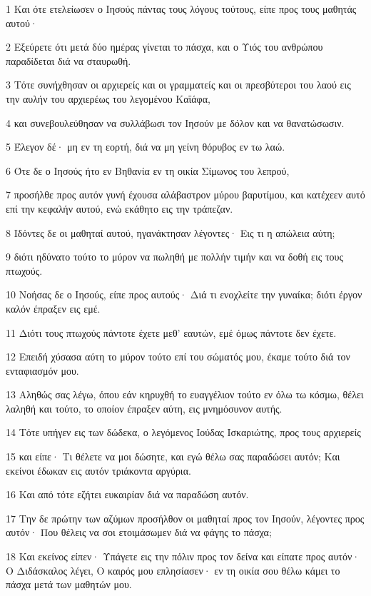 \par 1 Και ότε ετελείωσεν ο Ιησούς πάντας τους λόγους τούτους, είπε προς τους μαθητάς αυτού·
\par 2 Εξεύρετε ότι μετά δύο ημέρας γίνεται το πάσχα, και ο Υιός του ανθρώπου παραδίδεται διά να σταυρωθή.
\par 3 Τότε συνήχθησαν οι αρχιερείς και οι γραμματείς και οι πρεσβύτεροι του λαού εις την αυλήν του αρχιερέως του λεγομένου Καϊάφα,
\par 4 και συνεβουλεύθησαν να συλλάβωσι τον Ιησούν με δόλον και να θανατώσωσιν.
\par 5 Έλεγον δέ· μη εν τη εορτή, διά να μη γείνη θόρυβος εν τω λαώ.
\par 6 Ότε δε ο Ιησούς ήτο εν Βηθανία εν τη οικία Σίμωνος του λεπρού,
\par 7 προσήλθε προς αυτόν γυνή έχουσα αλάβαστρον μύρου βαρυτίμου, και κατέχεεν αυτό επί την κεφαλήν αυτού, ενώ εκάθητο εις την τράπεζαν.
\par 8 Ιδόντες δε οι μαθηταί αυτού, ηγανάκτησαν λέγοντες· Εις τι η απώλεια αύτη;
\par 9 διότι ηδύνατο τούτο το μύρον να πωληθή με πολλήν τιμήν και να δοθή εις τους πτωχούς.
\par 10 Νοήσας δε ο Ιησούς, είπε προς αυτούς· Διά τι ενοχλείτε την γυναίκα; διότι έργον καλόν έπραξεν εις εμέ.
\par 11 Διότι τους πτωχούς πάντοτε έχετε μεθ' εαυτών, εμέ όμως πάντοτε δεν έχετε.
\par 12 Επειδή χύσασα αύτη το μύρον τούτο επί του σώματός μου, έκαμε τούτο διά τον ενταφιασμόν μου.
\par 13 Αληθώς σας λέγω, όπου εάν κηρυχθή το ευαγγέλιον τούτο εν όλω τω κόσμω, θέλει λαληθή και τούτο, το οποίον έπραξεν αύτη, εις μνημόσυνον αυτής.
\par 14 Τότε υπήγεν εις των δώδεκα, ο λεγόμενος Ιούδας Ισκαριώτης, προς τους αρχιερείς
\par 15 και είπε· Τι θέλετε να μοι δώσητε, και εγώ θέλω σας παραδώσει αυτόν; Και εκείνοι έδωκαν εις αυτόν τριάκοντα αργύρια.
\par 16 Και από τότε εζήτει ευκαιρίαν διά να παραδώση αυτόν.
\par 17 Την δε πρώτην των αζύμων προσήλθον οι μαθηταί προς τον Ιησούν, λέγοντες προς αυτόν· Που θέλεις να σοι ετοιμάσωμεν διά να φάγης το πάσχα;
\par 18 Και εκείνος είπεν· Υπάγετε εις την πόλιν προς τον δείνα και είπατε προς αυτόν· Ο Διδάσκαλος λέγει, Ο καιρός μου επλησίασεν· εν τη οικία σου θέλω κάμει το πάσχα μετά των μαθητών μου.
